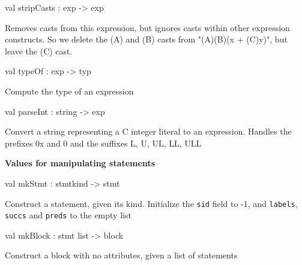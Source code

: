 \documentclass[11pt]{article}
\begin{document}
\label{val:Cil.stripCasts}\begin{ocamldoccode}
val stripCasts : exp -> exp
\end{ocamldoccode}
\begin{ocamldocdescription}
Removes casts from this expression, but ignores casts within
  other expression constructs.  So we delete the (A) and (B) casts from 
  "(A)(B)(x + (C)y)", but leave the (C) cast.


\end{ocamldocdescription}




\label{val:Cil.typeOf}\begin{ocamldoccode}
val typeOf : exp -> typ
\end{ocamldoccode}
\begin{ocamldocdescription}
Compute the type of an expression


\end{ocamldocdescription}




\label{val:Cil.parseInt}\begin{ocamldoccode}
val parseInt : string -> exp
\end{ocamldoccode}
\begin{ocamldocdescription}
Convert a string representing a C integer literal to an expression. 
 Handles the prefixes 0x and 0 and the suffixes L, U, UL, LL, ULL


\end{ocamldocdescription}




{\bf Values for manipulating statements}



\label{val:Cil.mkStmt}\begin{ocamldoccode}
val mkStmt : stmtkind -> stmt
\end{ocamldoccode}
\begin{ocamldocdescription}
Construct a statement, given its kind. Initialize the {\tt{sid}} field to -1,
    and {\tt{labels}}, {\tt{succs}} and {\tt{preds}} to the empty list


\end{ocamldocdescription}




\label{val:Cil.mkBlock}\begin{ocamldoccode}
val mkBlock : stmt list -> block
\end{ocamldoccode}
\begin{ocamldocdescription}
Construct a block with no attributes, given a list of statements


\end{ocamldocdescription}
\end{document}

